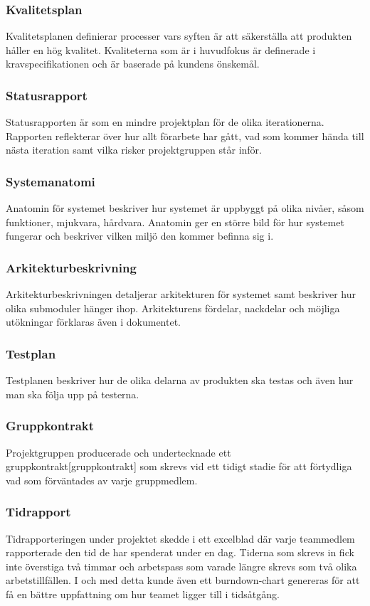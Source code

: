 \subsubsection*{Kvalitetsplan}
Kvalitetsplanen definierar processer vars syften är att säkerställa att produkten håller en hög kvalitet. Kvaliteterna som är i huvudfokus är definerade i kravspecifikationen och är baserade på kundens önskemål.

\subsubsection*{Statusrapport}
Statusrapporten är som en mindre projektplan för
de olika iterationerna. Rapporten reflekterar över hur allt förarbete har gått, vad som kommer
hända till nästa iteration samt vilka risker projektgruppen står inför.

\subsubsection*{Systemanatomi}
Anatomin för systemet beskriver hur systemet är uppbyggt på olika nivåer, såsom funktioner, 
mjukvara, hårdvara. Anatomin ger en större bild för hur systemet fungerar och beskriver vilken miljö den kommer
befinna sig i.

\subsubsection*{Arkitekturbeskrivning}
Arkitekturbeskrivningen detaljerar arkitekturen för systemet samt beskriver hur olika submoduler hänger ihop. Arkitekturens fördelar, nackdelar och möjliga utökningar förklaras även i dokumentet.

\subsubsection*{Testplan}
Testplanen beskriver hur de olika delarna av produkten ska testas och även hur man ska följa upp på testerna.

\subsubsection*{Gruppkontrakt}
Projektgruppen producerade och undertecknade ett gruppkontrakt[gruppkontrakt] som skrevs vid ett tidigt stadie för att förtydliga vad som förväntades av varje gruppmedlem.

\subsubsection*{Tidrapport}
Tidrapporteringen under projektet skedde i ett excelblad där varje teammedlem rapporterade den tid de har spenderat under en dag. Tiderna som skrevs in fick inte överstiga två timmar och arbetspass som varade längre skrevs som två olika arbetstillfällen. I och med detta kunde även ett burndown-chart genereras för att få en bättre uppfattning om hur teamet ligger till i tidsåtgång.

